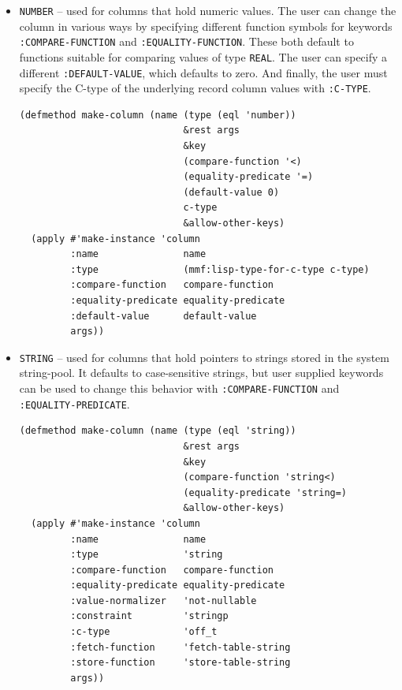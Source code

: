 \documentclass[article,oneside]{memoir}
\begin{document}
\begin{itemize}

\item \texttt{NUMBER} -- used for columns that hold numeric values. The user can change the column in various ways by specifying different function symbols for keywords \texttt{:COMPARE-FUNCTION} and \texttt{:EQUALITY-FUNCTION}. These both default to functions suitable for comparing values of type \texttt{REAL}. The user can specify a different \texttt{:DEFAULT-VALUE}, which defaults to zero. And finally, the user must specify the C-type of the underlying record column values with \texttt{:C-TYPE}. 

\begin{verbatim}
(defmethod make-column (name (type (eql 'number))
                             &rest args
                             &key
                             (compare-function '<)
                             (equality-predicate '=)
                             (default-value 0)
                             c-type
                             &allow-other-keys)
  (apply #'make-instance 'column
         :name               name
         :type               (mmf:lisp-type-for-c-type c-type)
         :compare-function   compare-function
         :equality-predicate equality-predicate
         :default-value      default-value
         args))

\end{verbatim}

\item \texttt{STRING} -- used for columns that hold pointers to strings stored in the system string-pool. It defaults to case-sensitive strings, but user supplied keywords can be used to change this behavior with \texttt{:COMPARE-FUNCTION} and \texttt{:EQUALITY-PREDICATE}.

\begin{verbatim}
(defmethod make-column (name (type (eql 'string))
                             &rest args
                             &key
                             (compare-function 'string<)
                             (equality-predicate 'string=)
                             &allow-other-keys)
  (apply #'make-instance 'column
         :name               name
         :type               'string
         :compare-function   compare-function
         :equality-predicate equality-predicate
         :value-normalizer   'not-nullable
         :constraint         'stringp
         :c-type             'off_t
         :fetch-function     'fetch-table-string
         :store-function     'store-table-string
         args))
\end{verbatim}


\end{itemize}
\end{document}
